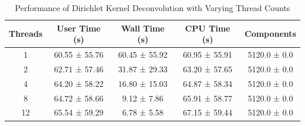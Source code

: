 \begin{table}[h]
\centering
\caption{Performance of Dirichlet Kernel Deconvolution with Varying Thread Counts}
\begin{tabular}{|c|c|c|c|c|}
\hline
Threads & User Time (s) & Wall Time (s) & CPU Time (s) & Components \\ \hline
1 & 60.55 ± 55.76 & 60.45 ± 55.92 & 60.95 ± 55.91 & 5120.0 ± 0.0 \\ \hline
2 & 62.71 ± 57.46 & 31.87 ± 29.33 & 63.20 ± 57.65 & 5120.0 ± 0.0 \\ \hline
4 & 64.20 ± 58.22 & 16.80 ± 15.03 & 64.87 ± 58.34 & 5120.0 ± 0.0 \\ \hline
8 & 64.72 ± 58.66 & 9.12 ± 7.86 & 65.91 ± 58.77 & 5120.0 ± 0.0 \\ \hline
12 & 65.54 ± 59.29 & 6.78 ± 5.58 & 67.15 ± 59.44 & 5120.0 ± 0.0 \\ \hline
\end{tabular}
\end{table}